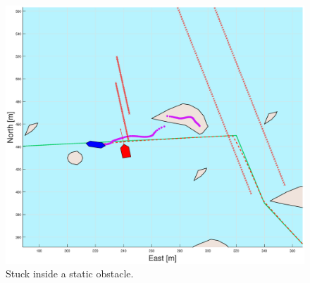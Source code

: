 \clearpage
\begin{figure}[!ht] %
    \centering
    \includegraphics[width=\textwidth]{Images/Figures/Extra_Stuff/w_optstuck}
    \caption{Stuck inside a static obstacle.}
\end{figure}

